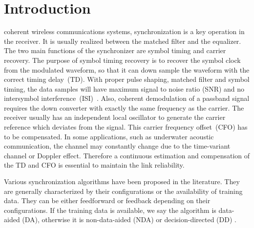 \documentclass[journal,comsoc]{IEEEtran}
\begin{document}
\section{Introduction}
\label{sec:intro}
 coherent wireless communications systems, synchronization is a key operation in the receiver.
It is usually realized between the matched filter and the equalizer.
The two main functions of the synchronizer are symbol timing and carrier recovery.
The purpose of symbol timing recovery is to recover the symbol clock from the modulated waveform, so that it can down sample the waveform with the correct timing delay~(TD).
With proper pulse shaping, matched filter and symbol timing, the data samples will have maximum signal to noise ratio (SNR) and no intersymbol interference~(ISI)~\cite{mengali1997synchronization}.
Also, coherent demodulation of a passband signal requires the down converter with exactly the same frequency as the carrier. 
The receiver usually has an independent local oscillator to generate the carrier reference which deviates from the signal.  
This carrier frequency offset~(CFO) has to be compensated. 
In some applications, such as underwater acoustic communication, the channel may constantly change due to the time-variant channel or Doppler effect. 
Therefore a continuous estimation and compensation of the TD and CFO is essential to maintain the link reliability.

Various synchronization algorithms have been proposed in the literature.
They are generally characterized by their configurations or the availability of training data.
They can be either feedforward or feedback depending on their configurations.
If the training data is available, we say the algorithm is data-aided (DA), otherwise it is non-data-aided (NDA) or decision-directed (DD) \cite{mengali1997synchronization}.

\end{document}
